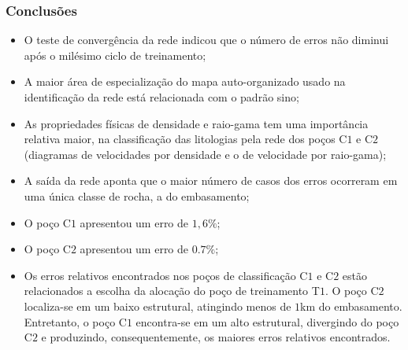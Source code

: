 \documentclass[aspectratio=10]{beamer} %
\begin{document}
\begin{frame}
\frametitle{Conclusões}
\begin{small}


\begin{itemize}
\item O teste de convergência da rede indicou que o número de erros não diminui após o milésimo ciclo de treinamento;
\pause
\item A maior área de especialização do mapa auto-organizado usado na identificação da rede está relacionada com o padrão sino;
\pause
\item As propriedades físicas de densidade e raio-gama tem uma importância relativa maior, na classificação das litologias pela rede dos poços  C$1$ e C$2$ (diagramas de velocidades por densidade e o de velocidade por raio-gama);
\pause
\item A saída da rede aponta que o maior número de casos dos erros ocorreram em uma única classe de rocha, a do embasamento;
\pause
\item O poço C$1$ apresentou um erro de $1,6\%$;
\pause
\item O poço C$2$ apresentou um erro de $0.7\%$;
\pause
\item Os erros relativos encontrados nos poços de classificação C$1$ e C$2$ estão relacionados a escolha da alocação do poço de treinamento T$1$. O poço C$2$ localiza-se em um baixo estrutural, atingindo menos de $1$km do embasamento. Entretanto, o poço C$1$ encontra-se em um alto estrutural, divergindo do poço C$2$ e produzindo, consequentemente, os maiores erros relativos encontrados. 
\end{itemize}
\end{small}	
\end{frame}




\end{document}

